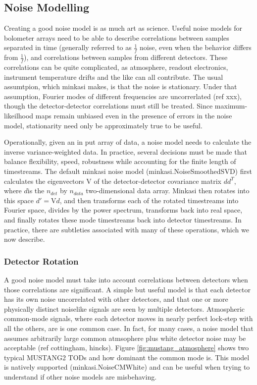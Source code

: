 \documentclass[12]{article}
\begin{document}
\subsection{Noise Modelling}

Creating a good noise model is as much art as science.  Useful noise
models for bolometer arrays need to be able to describe correlations
between samples separated in time (generally referred to as
$\frac{1}{f}$ noise, even when the behavior differs from
$\frac{1}{f}$), and correlations between samples from different
detectors.  These correlations can be quite complicated, as
atmosphere, readout electronics, instrument temperature drifts and the
like can all contribute.  The usual assumtpion, which minkasi makes,
is that the noise is stationary.  Under that assumption, Fourier modes
of different frequencies are uncorrerlated (ref xxx), though the
detector-detector correlations must still be treated.  Since
maximum-likeilhood maps remain unbiased even in the presence of errors
in the noise model, stationarity need only be approximately true to be
useful.  

Operationally, given an in put array of data, a noise model needs to
calculate the inverse variance-weighted data. In practice, several
decisions must be made that balance flexibility, speed, robustness
while accounting for the finite length of timestreams.  The default
minkasi noise model (minkasi.NoiseSmoothedSVD) first calculates the
eigenvectors $\mathrm{V}$ of 
the detector-detector covariance matrix $dd^T$, where $d$is the
$n_{det}$ by $n_{data}$ two-dimensional data array.  Minkasi then
rotates into this space $d'=\mathrm{V}d$, and then transforms each of
the rotated timestreams into Fourier space, divides by the power
spectrum, transforms back into real space, and finally rotates these
mode timestreams back into detector timestreams.  In practice, there
are subtleties associated with many of these operations, which we now
describe.  

\subsubsection{Detector Rotation}
A good noise model must take into account correlations between
detectors when those correlations are significant.  A simple but
useful model is that each detector has its own noise uncorrelated with
other detectors, and that one or more physically distinct noiselike
signals are seen by multiple detectors.  Atmospheric common-mode
signals, where each detector moves in nearly perfect lock-step with
all the others, are is one common case.  In fact, for many cases, a
noise model that assumes arbitrarily large common atmsophere plus
white detector noise may be acceptable (ref cottingham, hincks).  Figure
\ref{fig:mustang_atmosphere} shows two typical MUSTANG2 TODs and
how dominant the common mode is.  This model is natively
supported (minkasi.NoiseCMWhite) and can be useful when trying to
understand if other noise models are misbehaving.  
\end{document}
